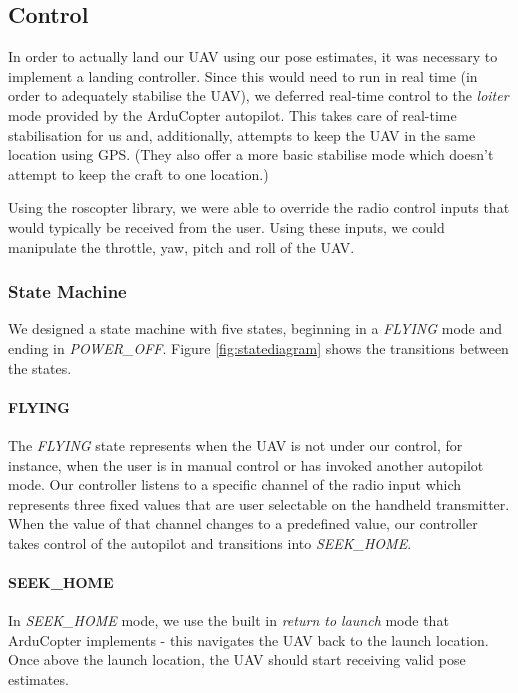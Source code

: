 \documentclass[10pt]{scrartcl} %
\begin{document}
\subsection{Control}
In order to actually land our UAV using our pose estimates, it was necessary to implement a landing controller. Since this would need to run in real time (in order to adequately stabilise the UAV), we deferred real-time control to the \textit{loiter} mode provided by the ArduCopter autopilot. This takes care of real-time stabilisation for us and, additionally, attempts to keep the UAV in the same location using GPS. (They also offer a more basic stabilise mode which doesn't attempt to keep the craft to one location.)

Using the roscopter library, we were able to override the radio control inputs that would typically be received from the user. Using these inputs, we could manipulate the throttle, yaw, pitch and roll of the UAV.


\subsubsection{State Machine}
We designed a state machine with five states, beginning in a \textit{FLYING} mode and ending in \textit{POWER\_OFF}. Figure \ref{fig:statediagram} shows the transitions between the states. 

\paragraph{FLYING}
The \textit{FLYING} state represents when the UAV is not under our control, for instance, when the user is in manual control or has invoked another autopilot mode. Our controller listens to a specific channel of the radio input which represents three fixed values that are user selectable on the handheld transmitter. When the value of that channel changes to a predefined value, our controller takes control of the autopilot and transitions into \textit{SEEK\_HOME}.

\paragraph{SEEK\_HOME}
In \textit{SEEK\_HOME} mode, we use the built in \textit{return to launch} mode that ArduCopter implements - this navigates the UAV back to the launch location. Once above the launch location, the UAV should start receiving valid pose estimates.
\end{document}
